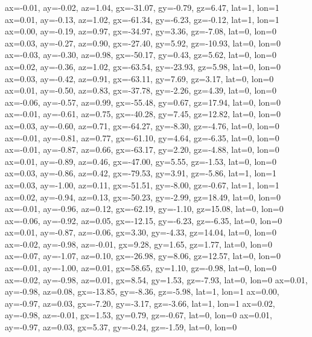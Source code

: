 ax=-0.01, ay=-0.02, az=1.04, gx=-31.07, gy=-0.79, gz=6.47, lat=1, lon=1
ax=0.01, ay=-0.13, az=1.02, gx=-61.34, gy=-6.23, gz=-0.12, lat=1, lon=1
ax=0.00, ay=-0.19, az=0.97, gx=-34.97, gy=3.36, gz=-7.08, lat=0, lon=0
ax=0.03, ay=-0.27, az=0.90, gx=-27.40, gy=5.92, gz=-10.93, lat=0, lon=0
ax=-0.03, ay=-0.30, az=0.98, gx=-50.17, gy=0.43, gz=5.62, lat=0, lon=0
ax=0.02, ay=-0.36, az=1.02, gx=-63.54, gy=-23.93, gz=5.98, lat=0, lon=0
ax=0.03, ay=-0.42, az=0.91, gx=-63.11, gy=7.69, gz=3.17, lat=0, lon=0
ax=0.01, ay=-0.50, az=0.83, gx=-37.78, gy=-2.26, gz=4.39, lat=0, lon=0
ax=-0.06, ay=-0.57, az=0.99, gx=-55.48, gy=0.67, gz=17.94, lat=0, lon=0
ax=-0.01, ay=-0.61, az=0.75, gx=-40.28, gy=7.45, gz=12.82, lat=0, lon=0
ax=0.03, ay=-0.60, az=0.71, gx=-64.27, gy=-8.30, gz=-4.76, lat=0, lon=0
ax=-0.01, ay=-0.81, az=0.77, gx=-61.10, gy=4.64, gz=-6.35, lat=0, lon=0
ax=-0.01, ay=-0.87, az=0.66, gx=-63.17, gy=2.20, gz=-4.88, lat=0, lon=0
ax=0.01, ay=-0.89, az=0.46, gx=-47.00, gy=5.55, gz=-1.53, lat=0, lon=0
ax=0.03, ay=-0.86, az=0.42, gx=-79.53, gy=3.91, gz=-5.86, lat=1, lon=1
ax=0.03, ay=-1.00, az=0.11, gx=-51.51, gy=-8.00, gz=-0.67, lat=1, lon=1
ax=0.02, ay=-0.94, az=0.13, gx=-50.23, gy=-2.99, gz=18.49, lat=0, lon=0
ax=-0.01, ay=-0.96, az=0.12, gx=-62.19, gy=-1.10, gz=15.08, lat=0, lon=0
ax=-0.06, ay=-0.92, az=0.05, gx=-12.15, gy=-6.23, gz=-6.35, lat=0, lon=0
ax=0.01, ay=-0.87, az=-0.06, gx=3.30, gy=-4.33, gz=14.04, lat=0, lon=0
ax=-0.02, ay=-0.98, az=-0.01, gx=9.28, gy=1.65, gz=1.77, lat=0, lon=0
ax=-0.07, ay=-1.07, az=0.10, gx=-26.98, gy=8.06, gz=12.57, lat=0, lon=0
ax=-0.01, ay=-1.00, az=0.01, gx=58.65, gy=1.10, gz=-0.98, lat=0, lon=0
ax=-0.02, ay=-0.98, az=0.01, gx=8.54, gy=1.53, gz=-7.93, lat=0, lon=0
ax=0.01, ay=-0.98, az=0.08, gx=-13.85, gy=-8.36, gz=-5.98, lat=1, lon=1
ax=0.00, ay=-0.97, az=0.03, gx=-7.20, gy=-3.17, gz=-3.66, lat=1, lon=1
ax=0.02, ay=-0.98, az=-0.01, gx=1.53, gy=0.79, gz=-0.67, lat=0, lon=0
ax=0.01, ay=-0.97, az=0.03, gx=5.37, gy=-0.24, gz=-1.59, lat=0, lon=0
